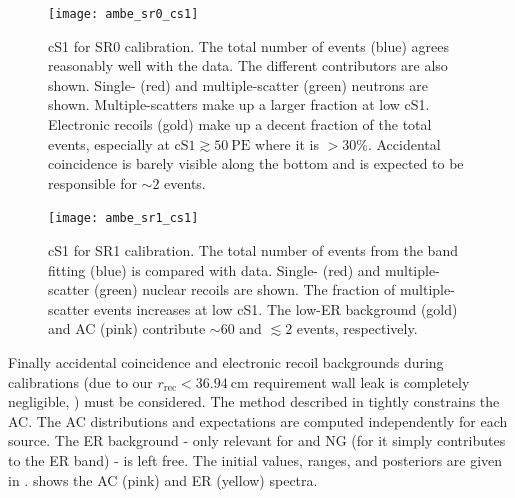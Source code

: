 \begin{figure}
\centering
\texttt{[image: ambe\_sr0\_cs1]}
\caption{cS1 for SR0 \ambe calibration.  The total number of events (blue) agrees reasonably well with the data.  The different
contributors are also shown.  Single- (red) and multiple-scatter (green) neutrons are shown.  Multiple-scatters make up a larger fraction
at low cS1.  Electronic recoils (gold) make up a decent fraction of the total events, especially at $\mathrm{cS1} \gtrsim 50\ \mathrm{PE}$
where it is $> 30\%$.  Accidental coincidence is barely visible along the bottom and is expected to be responsible for ${\sim}2$ events.}
\label{fig:er_nr_calibrations_results_ambe_sr0_cs1}
\end{figure}

\begin{figure}
\centering
\texttt{[image: ambe\_sr1\_cs1]}
\caption{cS1 for SR1 \ambe calibration.  The total number of events from the band fitting (blue) is compared with data.  Single- (red)
and multiple-scatter (green) nuclear recoils are shown.  The fraction of multiple-scatter events increases at low cS1.  The low-ER
background (gold) and AC (pink) contribute ${\sim}60$ and $\lesssim 2$ events, respectively.}
\label{fig:er_nr_calibrations_results_ambe_sr1_cs1}
\end{figure}

Finally accidental coincidence and electronic recoil backgrounds during calibrations (due to our
$r_{\mathrm{rec}} < 36.94\ \mathrm{cm}$
requirement wall leak is completely negligible, ) must
be considered.  The method
described in  tightly constrains the AC.  The AC
distributions and expectations are computed independently for each source.  The ER background - only relevant for \ambe and NG
(for  it simply contributes to the ER band) - is left free.  The initial values, ranges, and posteriors are given in
.   shows the AC (pink) and ER (yellow)
spectra.

